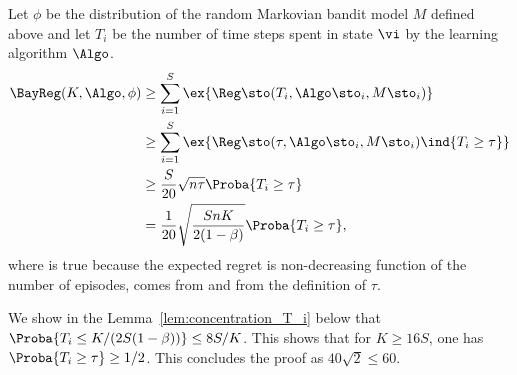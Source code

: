Let $\phi$ be the distribution of the random Markovian bandit model $M$ defined above and let $T_i$ be the number of time steps spent in state $\vi$ by the learning algorithm $\Algo$.
\begin{align}
    \BayReg(K,\Algo, \phi)
    &\ge \sum_{i=1}^S\ex{\Reg\sto(T_i, \Algo\sto_i, M\sto_i)} \nonumber\\
    &\ge \sum_{i=1}^S\ex{\Reg\sto(\tau, \Algo\sto_i,  M\sto_i)\ind{T_i\ge\tau}}\label{eq:non-decreasing}\\
    &\ge \frac{S}{20} \sqrt{n\tau}\Proba{T_i\ge \tau}\label{eq:lower2}\\
    &= \frac1{20} \sqrt{\frac{SnK}{2(1-\beta)}}\Proba{T_i\ge \tau},\label{eq:tau}
\end{align}
where  is true because the expected regret is non-decreasing function of the number of episodes,  comes from  and  from the definition of $\tau$.

We show in the Lemma~\ref{lem:concentration_T_i} below that $\Proba{T_i\le K/(2S(1-\beta))}\le 8S/K$. This shows that for $K\ge16S$, one has $\Proba{T_i\ge \tau}\ge1/2$. This concludes the proof as $40\sqrt{2}\le60$. 

